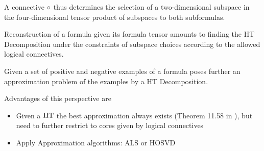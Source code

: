 A connective $\circ$ thus determines the selection of a two-dimensional subspace in the four-dimensional tensor product of subspaces to both subformulas.


Reconstruction of a formula given its formula tensor amounts to finding the HT Decomposition under the constraints of subspace choices according to the allowed logical connectives.

Given a set of positive and negative examples of a formula poses further an approximation problem of the examples by a HT Decomposition.

Advantages of this perspective are
\begin{itemize}
	\item Given a $\mathrm{HT}$ the best approximation always exists (Theorem 11.58 in \cite{hackbusch_tensor_2012}), but need to further restrict to cores given by logical connectives 
	\item Apply Approximation algorithms: ALS or HOSVD
\end{itemize}




%
%













